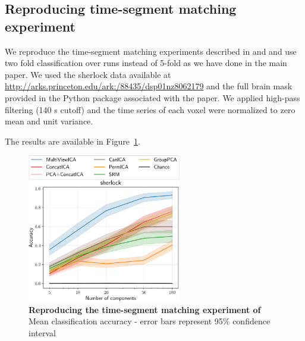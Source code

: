 \documentclass[12pt]{report}
\begin{document}
\subsection{Reproducing time-segment matching experiment}
\label{appendix_reproduce}
We reproduce the time-segment matching experiments described in \cite{chen2016convolutional} and \cite{zhang2016searchlight} and use two fold classification over runs instead of 5-fold as we have done in the main paper. We used the sherlock data available at \url{http://arks.princeton.edu/ark:/88435/dsp01nz8062179} and the full brain mask provided in the Python package associated with the paper. We applied high-pass filtering (140 s cutoff) and the time series of each voxel were normalized to zero mean and unit variance.

The results are available in Figure~\ref{fig:supp_timesegment}.

\begin{figure}
  \centering
  \includegraphics[width=0.6\textwidth]{figures/mvica/timesegment_matching_cae.pdf}
  \caption{\textbf{Reproducing the time-segment matching experiment of \cite{chen2016convolutional}~\cite{zhang2016searchlight}} Mean classification accuracy - error bars represent 95\% confidence interval}
  \label{fig:supp_timesegment}
\end{figure}
\end{document}
